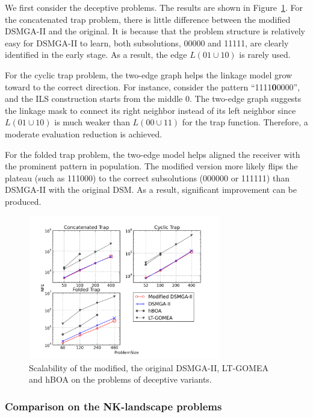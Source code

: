 \documentclass{sig-alternate-05-2015}
\begin{document}
We first consider the deceptive problems. The results are shown in Figure~\ref{fig:trap}.
For the concatenated trap problem, there is little difference between the modified DSMGA-II and the original. It is because that the problem structure is relatively easy for DSMGA-II to learn, both subsolutions, 00000 and 11111, are clearly identified in the early stage. As a result, the edge $L(01\cup10)$ is rarely used. 


For the cyclic trap problem, the two-edge graph helps the linkage model grow toward to the correct direction. For instance, consider the pattern ``1111\textbf{0}0000'', and the ILS construction starts from the middle 0. The two-edge graph suggests the linkage mask to connect its right neighbor instead of its left neighbor since $L(01\cup10)$ is much weaker than $L(00\cup11)$ for the trap function. Therefore, a moderate evaluation reduction is achieved. 

For the folded trap problem, the two-edge model helps aligned the receiver with the prominent pattern in population. The modified version more likely flips the plateau (such as 111000) to the correct subsolutions (000000 or 111111) than DSMGA-II with the original DSM. As a result, significant improvement can be produced. 



\begin{figure}
\centering
\includegraphics[width=3.3in]{trapResults}
\caption{Scalability of the modified, the original DSMGA-II, LT-GOMEA and hBOA on the problems of deceptive variants.}
\label{fig:trap}
\end{figure}


\subsubsection{Comparison on the NK-landscape problems}
\end{document}
